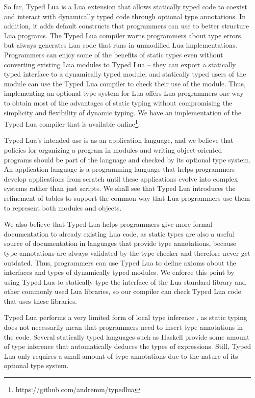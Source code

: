 So far, Typed Lua is a Lua extension that allows statically typed
code to coexist and interact with dynamically typed code
through optional type annotations.
In addition, it adds default constructs that programmers can use
to better structure Lua programs.
The Typed Lua compiler warns programmers about type errors,
but always generates Lua code that runs in unmodified Lua implementations.
Programmers can enjoy some of the benefits of static types
even without converting existing Lua modules to Typed Lua --
they can export a statically typed interface to a dynamically typed module,
and statically typed users of the module can use the Typed Lua compiler
to check their use of the module.
Thus, implementing an optional type system for Lua offers Lua
programmers one way to obtain most of the advantages of static typing
without compromising the simplicity and flexibility of dynamic typing.
We have an implementation of the Typed Lua compiler that is
available online\footnote{https://github.com/andremm/typedlua}.

Typed Lua's intended use is as an application language, and
we believe that policies for organizing a program in modules and writing
object-oriented programs should be part of the language and
checked by its optional type system.
An application language is a programming language that helps
programmers develop applications from scratch until these
applications evolve into complex systems rather than just scripts.
We shall see that Typed Lua introduces the refinement of
tables to support the common way that Lua programmers use
them to represent both modules and objects.

We also believe that Typed Lua helps programmers give more
formal documentation to already existing Lua code, as static types
are also a useful source of documentation in languages that provide
type annotations, because type annotations are always validated by
the type checker and therefore never get outdated.
Thus, programmers can use Typed Lua to define axioms about the
interfaces and types of dynamically typed modules.
We enforce this point by using Typed Lua to statically type
the interface of the Lua standard library and other commonly used
Lua libraries, so our compiler can check Typed Lua code that uses
these libraries.

Typed Lua performs a very limited form of local type inference
\citep{pierce2000lti}, as static typing does not necessarily mean
that programmers need to insert type annotations in the code.
Several statically typed languages such as Haskell provide some
amount of type inference that automatically deduces the types of
expressions.
Still, Typed Lua only requires a small amount of type annotations
due to the nature of its optional type system.

